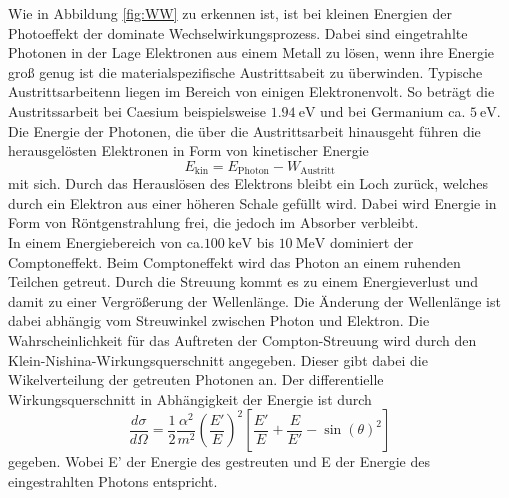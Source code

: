 Wie in Abbildung \ref{fig:WW} zu erkennen ist, ist bei kleinen Energien der Photoeffekt der 
dominate Wechselwirkungsprozess. Dabei sind eingetrahlte Photonen in der Lage Elektronen aus 
einem Metall zu lösen, wenn ihre Energie groß genug ist die materialspezifische Austrittsabeit
zu überwinden. Typische Austrittsarbeitenn liegen im Bereich von einigen Elektronenvolt. So beträgt 
die Austritssarbeit bei Caesium beispielsweise $\SI{1,94}{\electronvolt}$ und bei Germanium
ca. $\SI{5}{\electronvolt}$. Die Energie der Photonen, die über die Austrittsarbeit hinausgeht
führen die herausgelösten Elektronen in Form von kinetischer Energie 
\begin{equation}
    E_\text{kin} = E_\text{Photon} - W_\text{Austritt}
\end{equation}
mit sich. Durch das Herauslösen des Elektrons bleibt ein Loch zurück, welches durch ein Elektron 
aus einer höheren Schale gefüllt wird. Dabei wird Energie in Form von Röntgenstrahlung frei, die 
jedoch im Absorber verbleibt. \\ 
In einem Energiebereich von ca.$\SI{100}{\kilo\electronvolt}$ bis $\SI{10}{\mega\electronvolt}$ dominiert
der Comptoneffekt. Beim Comptoneffekt wird das Photon an einem ruhenden Teilchen getreut. 
Durch die Streuung kommt es zu einem Energieverlust und damit zu einer Vergrößerung der 
Wellenlänge. Die Änderung der Wellenlänge ist dabei abhängig vom Streuwinkel zwischen Photon und 
Elektron. Die Wahrscheinlichkeit für das Auftreten der Compton-Streuung wird durch den 
Klein-Nishina-Wirkungsquerschnitt angegeben. Dieser gibt dabei die Wikelverteilung der getreuten
Photonen an. 
Der differentielle Wirkungsquerschnitt in Abhängigkeit der Energie ist durch
\begin{equation}
    \frac{d\sigma}{d\Omega} = \frac{1}{2} \frac{\alpha^2}{m^2} \left(\frac{E'}{E}\right)^2 \left[\frac{E'}{E}+\frac{E}{E'}-\sin(\theta)^2\right]
\end{equation} \noindent
gegeben. Wobei E' der Energie des gestreuten und E der Energie des eingestrahlten Photons entspricht.